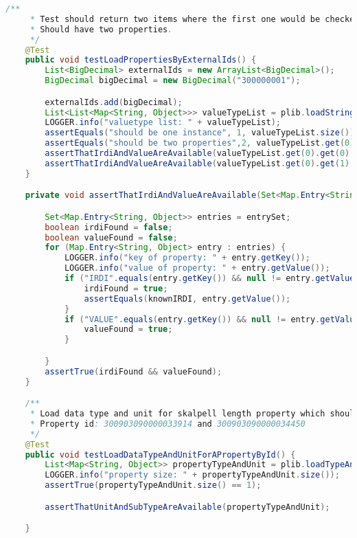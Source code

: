 \begin{lstlisting}[caption=Beispiel eines Integrationstests, language=Java, label=lst:integrationstest_beispiel]
    /**
     * Test should return two items where the first one would be checked.
     * Should have two properties.
     */
    @Test
    public void testLoadPropertiesByExternalIds() {
        List<BigDecimal> externalIds = new ArrayList<BigDecimal>();
        BigDecimal bigDecimal = new BigDecimal("300000001");

        externalIds.add(bigDecimal);
        List<List<Map<String, Object>>> valueTypeList = plib.loadStringPropertiesByExternalIds(externalIds);
        LOGGER.info("valuetype list: " + valueTypeList);
        assertEquals("should be one instance", 1, valueTypeList.size());
        assertEquals("should be two properties",2, valueTypeList.get(0).size());
        assertThatIrdiAndValueAreAvailable(valueTypeList.get(0).get(0).entrySet(), "0173-1#02-AAA762#1");
        assertThatIrdiAndValueAreAvailable(valueTypeList.get(0).get(1).entrySet(), "0173-1#02-AAB011#1");
    }

    private void assertThatIrdiAndValueAreAvailable(Set<Map.Entry<String, Object>> entrySet, String knownIRDI) {

        Set<Map.Entry<String, Object>> entries = entrySet;
        boolean irdiFound = false;
        boolean valueFound = false;
        for (Map.Entry<String, Object> entry : entries) {
            LOGGER.info("key of property: " + entry.getKey());
            LOGGER.info("value of property: " + entry.getValue());
            if ("IRDI".equals(entry.getKey()) && null != entry.getValue() && !"null".equals(entry.getValue())) {
                irdiFound = true;
                assertEquals(knownIRDI, entry.getValue());
            }
            if ("VALUE".equals(entry.getKey()) && null != entry.getValue() && !"null".equals(entry.getValue())) {
                valueFound = true;
            }

        }
        assertTrue(irdiFound && valueFound);
    }

    /**
     * Load data type and unit for skalpell length property which should be mm and mm as well.
     * Property id: 300903090000033914 and 300903090000034450
     */
    @Test
    public void testLoadDataTypeAndUnitForAPropertyById() {
        List<Map<String, Object>> propertyTypeAndUnit = plib.loadTypeAndUnitOfPropertyBy("300903090000033914");
        LOGGER.info("property size: " + propertyTypeAndUnit.size());
        assertTrue(propertyTypeAndUnit.size() == 1);

        assertThatUnitAndSubTypeAreAvailable(propertyTypeAndUnit);

    }


\end{lstlisting}
